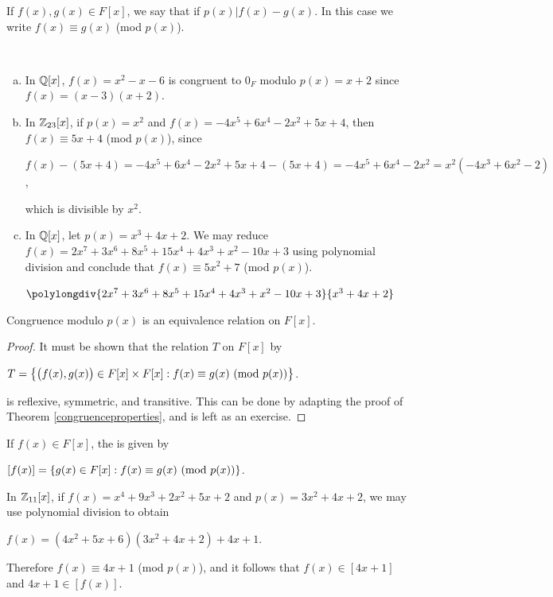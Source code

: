 \documentclass[11pt,fleqn,dvipsnames,usenames]{article}
\begin{document}
\begin{definition}
If $f(x),g(x)\in F[x]$, we say that  if $p(x)|f(x) - g(x)$.  In this case we write $f(x)\equiv g(x)$ (mod $p(x)$).
\end{definition}
%
\begin{examples}~
\begin{enumerate}[(a)]
\item In $\mathbb{Q}[x]$, $f(x) = x^2 - x - 6$ is congruent to $0_{F}$ modulo $p(x) = x+2$ since $f(x) = (x-3)(x+2)$.
\item In $\mathbb{Z}_{23}[x]$, if $p(x) = x^2$ and $f(x) = -4x^5 + 6x^4 - 2x^2 + 5x + 4$, then $f(x) \equiv 5x + 4$ (mod $p(x)$), since
\begin{center}
$f(x) - (5x + 4) = -4x^5 + 6x^4 - 2x^2 + 5x + 4 - (5x + 4) = -4x^5 + 6x^4 - 2x^2 = x^2(-4x^3 + 6x^2 - 2)$,
\end{center}
which is divisible by $x^2$.
\item In $\mathbb{Q}[x]$, let $p(x) = x^3 + 4x + 2$.  We may reduce $f(x) = 2x^7 + 3x^6 + 8x^5 + 15x^4 + 4x^3 + x^2 - 10x + 3$ using polynomial division and conclude that $f(x) \equiv 5x^2 + 7$ (mod $p(x)$).
\begin{center}
$\polylongdiv{2x^7 + 3x^6 + 8x^5 + 15x^4 + 4x^3 + x^2 - 10x + 3}{x^3 + 4x + 2}$
\end{center}
\end{enumerate}
\end{examples}
%

\begin{theorem}
Congruence modulo $p(x)$ is an equivalence relation on $F[x]$.
\end{theorem}
%
\begin{proof}
It must be shown that the relation $T$ on $F[x]$ by
\begin{center}
$T = \left\{\big(f(x),g(x)\big)\in F[x]\times F[x]:f(x)\equiv g(x)\text{ (mod }p(x)\text{)}\right\}$.
\end{center}
is reflexive, symmetric, and transitive.  This can be done by adapting the proof of Theorem \ref{congruenceproperties}, and is left as an exercise.
\end{proof}
\vsmsp

\begin{definition}
If $f(x)\in F[x]$, the  is given by
\begin{center}
$[f(x)] = \left\{g(x)\in F[x]:f(x)\equiv g(x)\text{ (mod }p(x)\text{)}\right\}$.
\end{center}
\end{definition}
%
\begin{example}
In $\mathbb{Z}_{11}[x]$, if $f(x) = x^4 + 9x^3 + 2x^2 + 5x + 2$ and $p(x) = 3x^2 + 4x + 2$, we may use polynomial division to obtain
\begin{center}
$f(x) = (4x^2 + 5x + 6)(3x^2 + 4x + 2) + 4x +1$.
\end{center}
Therefore $f(x) \equiv 4x +1$ (mod $p(x)$), and it follows that $f(x)\in [4x + 1]$ and $4x+1\in [f(x)]$.
\end{example}
\vsmsp
\end{document}
